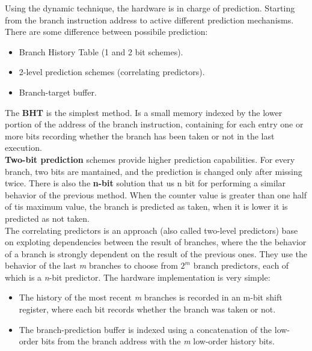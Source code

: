 \documentclass[12pt]{article}
\begin{document}
Using the dynamic technique, the hardware is in charge of prediction. Starting from the branch instruction address to active different prediction mechanisms. There are some difference between possibile prediction:
\begin{itemize}
  \item Branch History Table (1 and 2 bit schemes).
  \item 2-level prediction schemes (correlating predictors).
  \item Branch-target buffer.
\end{itemize}
The \textbf{BHT} is the simplest method. Is a small memory indexed by the lower portion of the address of the branch instruction, containing for each entry one or more bits recording whether the branch has been taken or not in the last execution.\\
\textbf{Two-bit prediction} schemes provide higher prediction capabilities. For every branch, two bits are mantained, and the prediction is changed only after missing twice. There is also the \textbf{n-bit} solution that us n bit for performing a similar behavior of the previous method. When the counter value is greater than one half of tis maximum value, the branch is predicted as taken, when it is lower it is predicted as not taken.\\
The correlating predictors is an approach (also called two-level predictors) base on exploting dependencies between the result of branches, where the the behavior of a branch is strongly dependent on the result of the previous ones. They use the behavior of the last \textit{m} branches to choose from $2^m$ branch predictors, each of which is a \textit{n}-bit predictor. The hardware implementation is very simple:
\begin{itemize}
  \item The history of the most recent \textit{m} branches is recorded in an m-bit shift register, where each bit records whether the branch was taken or not.
  \item The branch-prediction buffer is indexed using a concatenation of the low-order bits from the branch address with the \textit{m} low-order history bits.
\end{itemize}
\end{document}
